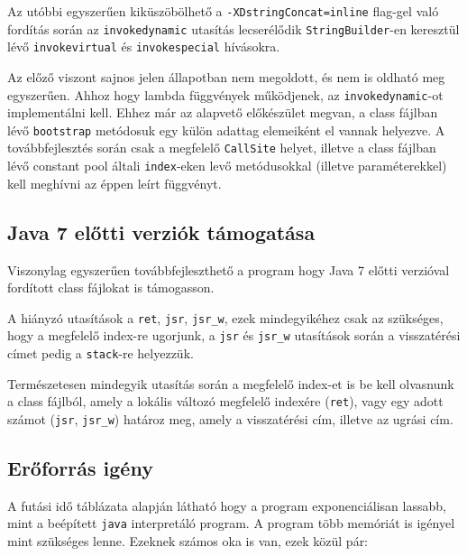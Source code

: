 Az utóbbi egyszerűen kiküszöbölhető a \lstinline{-XDstringConcat=inline} flag-gel való fordítás során az \lstinline{invokedynamic} utasítás lecserélődik \lstinline{StringBuilder}-en keresztül lévő \lstinline{invokevirtual} és \lstinline{invokespecial} hívásokra.

Az előző viszont sajnos jelen állapotban nem megoldott, és nem is oldható meg egyszerűen. Ahhoz hogy lambda függvények működjenek, az \lstinline{invokedynamic}-ot implementálni kell. Ehhez már az alapvető előkészület megvan, a class fájlban lévő \lstinline{bootstrap} metódosuk egy külön adattag elemeiként el vannak helyezve. A továbbfejlesztés során csak a megfelelő \lstinline{CallSite} helyet, illetve a class fájlban lévő constant pool általi \lstinline{index}-eken levő metódusokkal (illetve paraméterekkel) kell meghívni az éppen leírt függvényt.

\subsection{Java 7 előtti verziók támogatása}

Viszonylag egyszerűen továbbfejleszthető a program hogy Java 7 előtti verzióval fordított class fájlokat is támogasson.

A hiányzó utasítások a \lstinline{ret}, \lstinline{jsr}, \lstinline{jsr_w}, ezek mindegyikéhez csak az szükséges, hogy a megfelelő index-re ugorjunk, a \lstinline{jsr} és \lstinline{jsr_w} utasítások során a visszatérési címet pedig a \lstinline{stack}-re helyezzük.

Természetesen mindegyik utasítás során a megfelelő index-et is be kell olvasnunk a class fájlból, amely a lokális változó megfelelő indexére (\lstinline{ret}), vagy egy adott számot (\lstinline{jsr}, \lstinline{jsr_w}) határoz meg, amely a visszatérési cím, illetve az ugrási cím.

\subsection{Erőforrás igény}

A futási idő táblázata alapján látható hogy a program exponenciálisan lassabb, mint a beépített \lstinline{java} interpretáló program. A program több memóriát is igényel mint szükséges lenne. Ezeknek számos oka is van, ezek közül pár:

